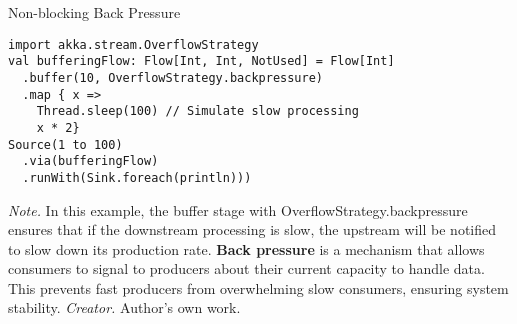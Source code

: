 \begin{table}[H]
\caption{Non-blocking Back Pressure}
\begin{lstlisting}
import akka.stream.OverflowStrategy
val bufferingFlow: Flow[Int, Int, NotUsed] = Flow[Int]
  .buffer(10, OverflowStrategy.backpressure)
  .map { x =>
    Thread.sleep(100) // Simulate slow processing
    x * 2}
Source(1 to 100)
  .via(bufferingFlow)
  .runWith(Sink.foreach(println)))
\end{lstlisting}
\small
\textit{Note.} In this example, the buffer stage with OverflowStrategy.backpressure ensures that if the downstream processing is slow, the upstream will be notified to slow down its production rate. \textbf{Back pressure} is a mechanism that allows consumers to signal to producers about their current capacity to handle data. This prevents fast producers from overwhelming slow consumers, ensuring system stability.
\textit{Creator.} Author's own work.
\end{table}